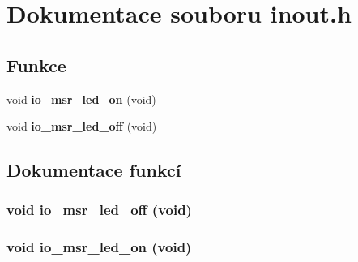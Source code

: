 \section{Dokumentace souboru inout.h}
\label{inout_8h}
\subsection*{Funkce}
\begin{DoxyCompactItemize}
\item 
void {\bf io\_\-msr\_\-led\_\-on} (void)
\item 
void {\bf io\_\-msr\_\-led\_\-off} (void)
\end{DoxyCompactItemize}


\subsection{Dokumentace funkcí}
\subsubsection[{io\_\-msr\_\-led\_\-off}]{\setlength{\rightskip}{0pt plus 5cm}void io\_\-msr\_\-led\_\-off (void)}\label{inout_8h_ac1d83154054f9bf4f80e8d38adf5bf42}
\subsubsection[{io\_\-msr\_\-led\_\-on}]{\setlength{\rightskip}{0pt plus 5cm}void io\_\-msr\_\-led\_\-on (void)}\label{inout_8h_a203f907fb83c309fe09d80666b7893d2}
